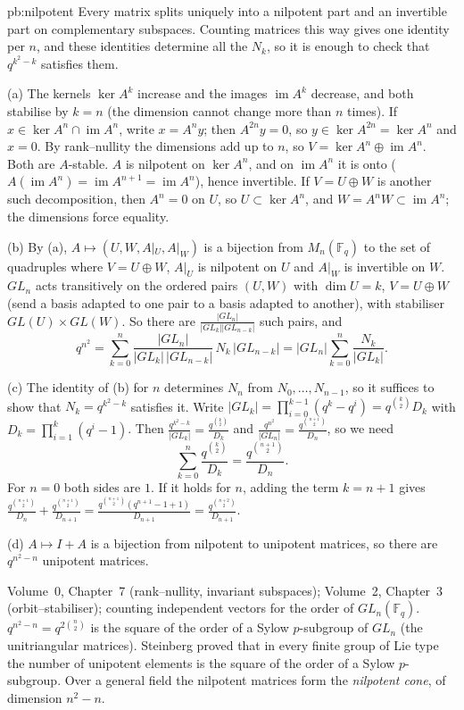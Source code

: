 \begin{solution}{pb:nilpotent}
\idea Every matrix splits uniquely into a nilpotent part and an invertible part on complementary subspaces. Counting matrices
this way gives one identity per $n$, and these identities determine all the $N_k$, so it is enough to check that $q^{k^2-k}$
satisfies them.

\writeup (a) The kernels $\ker A^k$ increase and the images $\operatorname{im}A^k$ decrease, and both stabilise by $k=n$ (the
dimension cannot change more than $n$ times). If $x\in\ker A^n\cap\operatorname{im}A^n$, write $x=A^ny$; then $A^{2n}y=0$, so
$y\in\ker A^{2n}=\ker A^n$ and $x=0$. By rank--nullity the dimensions add up to $n$, so $V=\ker A^n\oplus\operatorname{im}A^n$.
Both are $A$-stable. $A$ is nilpotent on $\ker A^n$, and on $\operatorname{im}A^n$ it is onto
($A(\operatorname{im}A^n)=\operatorname{im}A^{n+1}=\operatorname{im}A^n$), hence invertible. If $V=U\oplus W$ is another such
decomposition, then $A^n=0$ on $U$, so $U\subset\ker A^n$, and $W=A^nW\subset\operatorname{im}A^n$; the dimensions force equality.

(b) By (a), $A\mapsto(U,W,A|_U,A|_W)$ is a bijection from $M_n(\mathbb F_q)$ to the set of quadruples where $V=U\oplus W$, $A|_U$
is nilpotent on $U$ and $A|_W$ is invertible on $W$. $GL_n$ acts transitively on the ordered pairs $(U,W)$ with
$\dim U=k$, $V=U\oplus W$ (send a basis adapted to one pair to a basis adapted to another), with stabiliser $GL(U)\times GL(W)$.
So there are $\frac{|GL_n|}{|GL_k||GL_{n-k}|}$ such pairs, and
\[
q^{n^2}=\sum_{k=0}^n\frac{|GL_n|}{|GL_k|\,|GL_{n-k}|}\,N_k\,|GL_{n-k}|=|GL_n|\sum_{k=0}^n\frac{N_k}{|GL_k|}.
\]

(c) The identity of (b) for $n$ determines $N_n$ from $N_0,\dots,N_{n-1}$, so it suffices to show that $N_k=q^{k^2-k}$ satisfies
it. Write $|GL_k|=\prod_{i=0}^{k-1}(q^k-q^i)=q^{\binom k2}D_k$ with $D_k=\prod_{i=1}^k(q^i-1)$. Then
$\frac{q^{k^2-k}}{|GL_k|}=\frac{q^{\binom k2}}{D_k}$ and $\frac{q^{n^2}}{|GL_n|}=\frac{q^{\binom{n+1}2}}{D_n}$, so we need
\[
\sum_{k=0}^n\frac{q^{\binom k2}}{D_k}=\frac{q^{\binom{n+1}2}}{D_n}.
\]
For $n=0$ both sides are $1$. If it holds for $n$, adding the term $k=n+1$ gives
$\frac{q^{\binom{n+1}2}}{D_n}+\frac{q^{\binom{n+1}2}}{D_{n+1}}=\frac{q^{\binom{n+1}2}(q^{n+1}-1+1)}{D_{n+1}}=\frac{q^{\binom{n+2}2}}{D_{n+1}}$.

(d) $A\mapsto I+A$ is a bijection from nilpotent to unipotent matrices, so there are $q^{n^2-n}$ unipotent matrices.

\tools Volume~0, Chapter~7 (rank--nullity, invariant subspaces); Volume~2, Chapter~3 (orbit--stabiliser); counting independent vectors for the
order of $GL_n(\mathbb F_q)$.
\leads $q^{n^2-n}=q^{2\binom n2}$ is the square of the order of a Sylow $p$-subgroup of $GL_n$ (the unitriangular matrices).
Steinberg proved that in every finite group of Lie type the number of unipotent elements is the square of the order of a Sylow
$p$-subgroup. Over a general field the nilpotent matrices form the \emph{nilpotent cone}, of dimension $n^2-n$.
\end{solution}

